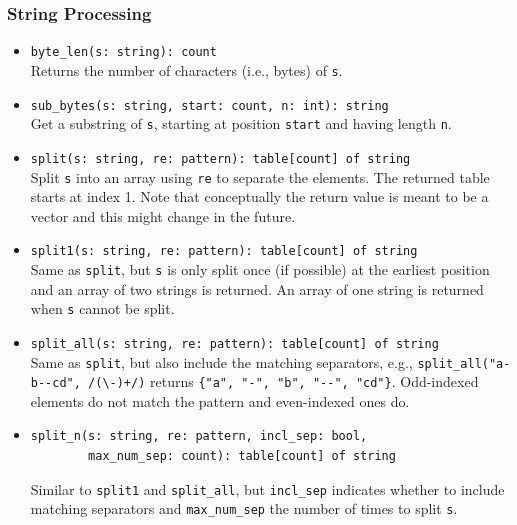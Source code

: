 \documentclass[10pt,landscape]{article}
\begin{document}
\begin{multicols*}{2}
\subsubsection*{String Processing}

\begin{itemize}
  \item \verb|byte_len(s: string): count|\\
    Returns the number of characters (i.e., bytes) of \texttt{s}.
  \item \verb|sub_bytes(s: string, start: count, n: int): string|\\
    Get a substring of \texttt{s}, starting at position \texttt{start} and
    having length \texttt{n}.
  \item \verb|split(s: string, re: pattern): table[count] of string|\\
    Split \texttt{s} into an array using \texttt{re} to separate the elements.
    The returned table starts at index 1. Note that conceptually the return
    value is meant to be a vector and this might change in the future.
  \item \verb|split1(s: string, re: pattern): table[count] of string|\\
    Same as \texttt{split}, but \texttt{s} is only split once (if possible) at
    the earliest position and an array of two strings is returned. An array of
    one string is returned when \texttt{s} cannot be split.
  \item \verb|split_all(s: string, re: pattern): table[count] of string|\\
    Same as \texttt{split}, but also include the matching separators, e.g.,
    \verb|split_all("a-b--cd", /(\-)+/)| returns
    \verb|{"a", "-", "b", "--", "cd"}|. Odd-indexed elements do not match the
    pattern and even-indexed ones do.
  \item
\begin{verbatim}
split_n(s: string, re: pattern, incl_sep: bool,
        max_num_sep: count): table[count] of string
\end{verbatim}
    Similar to \verb|split1| and \verb|split_all|, but \verb|incl_sep|
    indicates whether to include matching separators and \verb|max_num_sep| the
    number of times to split \texttt{s}.

\end{itemize}
\end{multicols*}
\end{document}
